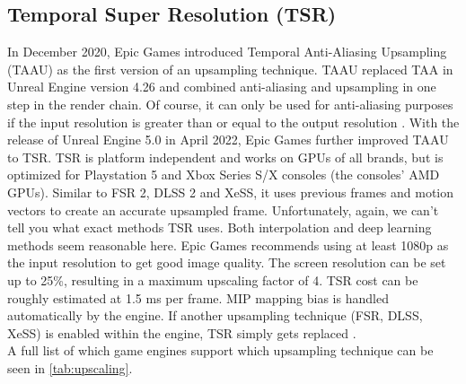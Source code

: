 \documentclass[letterpaper, 10 pt, conference]{ieeeconf}  %
\begin{document}
\subsection{Temporal Super Resolution (TSR)}

In December 2020, Epic Games introduced Temporal Anti-Aliasing Upsampling (TAAU) as the first version of an upsampling technique. 
TAAU replaced TAA in Unreal Engine version 4.26 and combined anti-aliasing and upsampling in one step in the render chain.
Of course, it can only be used for anti-aliasing purposes if the input resolution is greater than or equal to the output resolution \cite{unreal_all}.
With the release of Unreal Engine 5.0 in April 2022, Epic Games further improved TAAU to TSR.
TSR is platform independent and works on GPUs of all brands, but is optimized for Playstation 5 and Xbox Series S/X consoles (the consoles' AMD GPUs).
Similar to FSR 2, DLSS 2 and XeSS, it uses previous frames and motion vectors to create an accurate upsampled frame. 
Unfortunately, again, we can't tell you what exact methods TSR uses.
Both interpolation and deep learning methods seem reasonable here.
Epic Games recommends using at least 1080p as the input resolution to get good image quality.
The screen resolution can be set up to 25\%, resulting in a maximum upscaling factor of 4.
TSR cost can be roughly estimated at 1.5 ms per frame.
MIP mapping bias is handled automatically by the engine.
If another upsampling technique (FSR, DLSS, XeSS) is enabled within the engine, TSR simply gets replaced \cite{TSR_intro}.\\

A full list of which game engines support which upsampling technique can be seen in \ref{tab:upscaling}.
\end{document}
